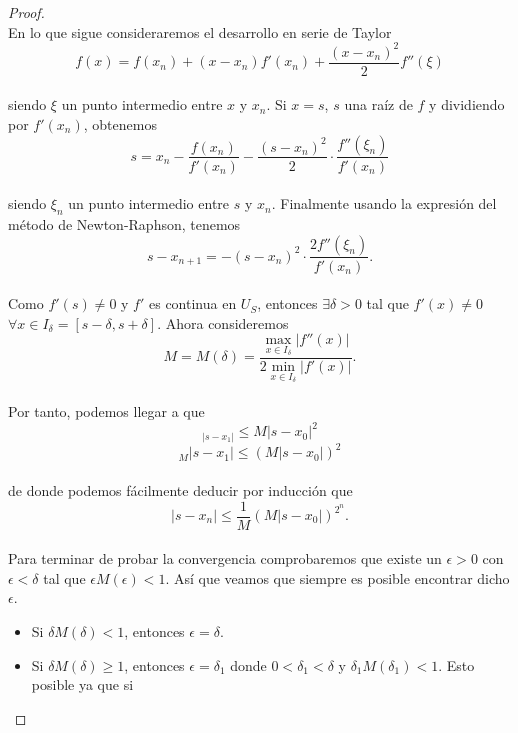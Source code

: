 \begin{proof}
	${ }$\\
	
	En lo que sigue consideraremos el desarrollo en serie de Taylor
	${ }$\\
	\[
		f(x) = f(x_n) + (x - x_n)f'(x_n) + \frac{(x - x_n)^2}{2} f''(\xi)
	\]
	${ }$\\
	siendo $\xi$ un punto intermedio entre $x$ y $x_n$. Si $x=s$, $s$ una raíz de $f$ y dividiendo por $f'(x_n)$, obtenemos
	${ }$\\
	\[
		s = x_n - \frac{f(x_n)}{f'(x_n)} - \frac{(s - x_n)^2}{2} \cdot \frac{f''(\xi_n)}{f'(x_n)}
	\]
	${ }$\\
	siendo $\xi_n$ un punto intermedio entre $s$ y $x_n$. Finalmente usando la expresión del método de Newton-Raphson, tenemos
	${ }$\\
	\[
		s - x_{n+1} = - (s - x_n)^2 \cdot \frac{2f''(\xi_n)}{f'(x_n)}.
	\]
	${ }$\\
	
	Como $f'(s) \neq 0$ y $f'$ es continua en $U_S$, entonces $\exists \delta > 0$ tal que $f'(x) \neq 0$ $\forall x \in I_{\delta} = [s - \delta, s + \delta]$. Ahora consideremos
	${ }$\\
	\[
		M = M(\delta) = \frac{\max_{x \in I_{\delta}} |f''(x)|}{2 \min_{x \in I_{\delta}} |f'(x)|}.
	\]
	${ }$\\

	Por tanto, podemos llegar a que
	${ }$\\
	\[_
		|s - x_1| \leq M |s - x_0|^2
	\]
	\[_
		M|s - x_1| \leq (M |s - x_0|)^2
	\]
	${ }$\\
	de donde podemos fácilmente deducir por inducción que
	${ }$\\
	\[
		|s - x_n| \leq \frac{1}{M} (M |s - x_0|)^{2^n}.
	\]
	${ }$\\
	
	Para terminar de probar la convergencia comprobaremos que existe un $\epsilon > 0$ con $\epsilon < \delta$ tal que $\epsilon M(\epsilon) < 1$. Así que veamos que siempre es posible encontrar dicho $\epsilon$.
	${ }$\\
	
	\begin{itemize}
		\item Si $\delta M(\delta) < 1$, entonces $\epsilon = \delta$.
		\item Si $\delta M(\delta) \geq 1$, entonces $\epsilon = \delta_1$ donde $0 < \delta_1 < \delta$ y $\delta_1 M(\delta_1) < 1$. Esto posible ya que si
		

\end{itemize}
\end{proof}
